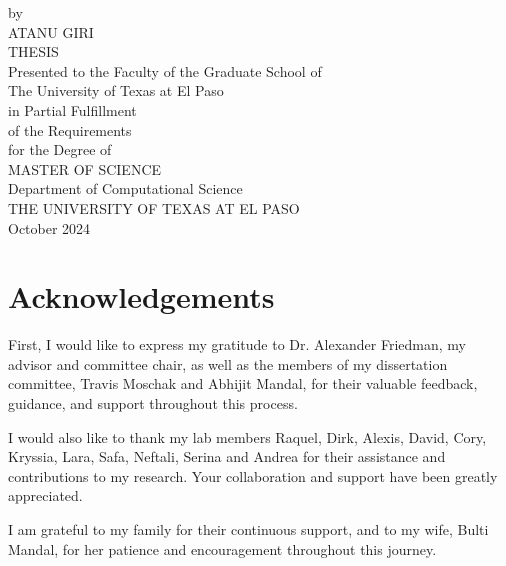 \documentclass{article}
\begin{document}
\clearpage

\date{}
\maketitle
{\centering
by\\
\vspace{1em}
ATANU GIRI\\
\vspace{1em}
THESIS\\
\vspace{1em}
Presented to the Faculty of the Graduate School of\\
The University of Texas at El Paso\\
in Partial Fulfillment\\
of the Requirements\\
for the Degree of\\
\vspace{1em}
MASTER OF SCIENCE\\
\vfill
Department of Computational Science\\
THE UNIVERSITY OF TEXAS AT EL PASO\\
October 2024\\}
\thispagestyle{empty}
\clearpage

\justifying

\section*{Acknowledgements}
First, I would like to express my gratitude to Dr. Alexander Friedman, my advisor and committee chair, as well as the members of my dissertation committee, Travis Moschak and Abhijit Mandal, for their valuable feedback, guidance, and support throughout this process.

\vspace{1em}

I would also like to thank my lab members Raquel, Dirk, Alexis, David, Cory, Kryssia, Lara, Safa, Neftali, Serina and Andrea for their assistance and contributions to my research. Your collaboration and support have been greatly appreciated.

\vspace{1em}

I am grateful to my family for their continuous support, and to my wife, Bulti Mandal, for her patience and encouragement throughout this journey.

\vspace{1em}
\end{document}
